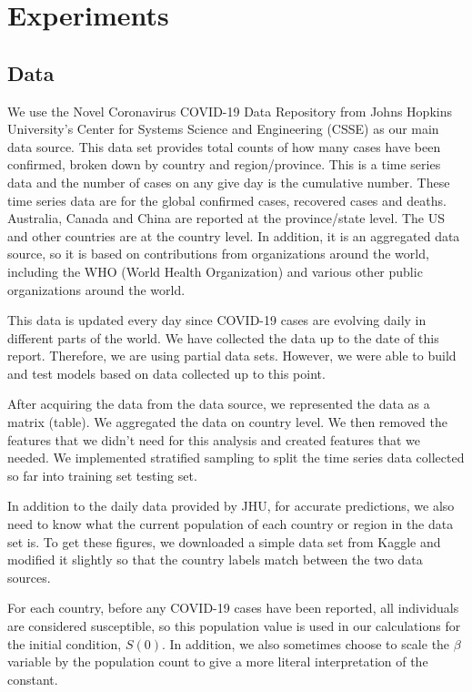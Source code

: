 \documentclass[11pt]{article}
\begin{document}
\section{Experiments}
\subsection{Data}
We use the Novel Coronavirus COVID-19 Data Repository from Johns Hopkins University’s Center for Systems Science and Engineering (CSSE) \cite{JHU-data} as our main data source. This data set provides total counts of how many cases have been confirmed, broken down by country and region/province. This is a time series data and the number of cases on any give day is the cumulative number. These time series data are for the global confirmed cases, recovered cases and deaths. Australia, Canada and China are reported at the province/state level. The US and other countries are at the country level. In addition, it is an aggregated data source, so it is based on contributions from organizations around the world, including the WHO (World Health Organization) and various other public organizations around the world.

This data is updated every day since COVID-19 cases are evolving daily in different parts of the world. We have collected the data up to the date of this report. Therefore, we are using partial data sets. However, we were able to build and test models based on data collected up to this point.

After acquiring the data from the data source, we represented the data as a matrix (table). We aggregated the data on country level. We then removed the features that we didn't need for this analysis and created features that we needed. We implemented stratified sampling to split the time series data collected so far into training set testing set.

In addition to the daily data provided by JHU, for accurate predictions, we also need to know what the current population of each country or region in the data set is. To get these figures, we downloaded a simple data set from Kaggle \cite{population-csv} and modified it slightly so that the country labels match between the two data sources.

For each country, before any COVID-19 cases have been reported, all individuals are considered susceptible, so this population value is used in our calculations for the initial condition, $S(0)$. In addition, we also sometimes choose to scale the $\beta$ variable by the population count to give a more literal interpretation of the constant.
\end{document}
